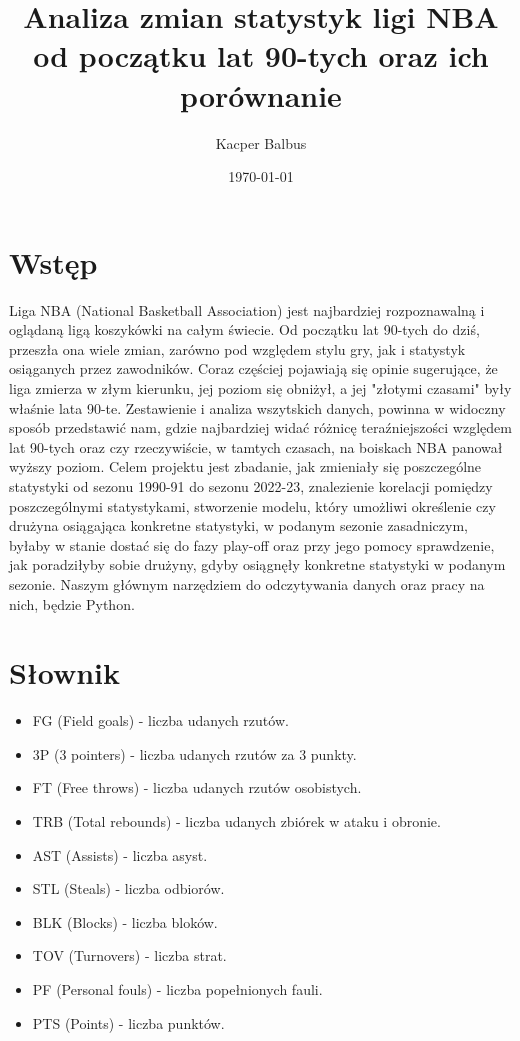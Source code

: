 \documentclass{article}
\title{Analiza zmian statystyk ligi NBA od początku lat 90-tych oraz ich porównanie}
\author{Kacper Balbus}
\date{\today}
\begin{document}
\maketitle

\newpage
\vspace{4cm}


\tableofcontents
\newpage

\section{Wstęp}



Liga NBA (National Basketball Association) jest najbardziej rozpoznawalną i oglądaną ligą koszykówki na całym świecie. Od początku lat 90-tych do dziś, przeszła ona wiele zmian, zarówno pod względem stylu gry, jak i statystyk osiąganych przez zawodników. Coraz częściej pojawiają się opinie sugerujące, że liga zmierza w złym kierunku, jej poziom się obniżył, a jej "złotymi czasami" były właśnie lata 90-te. Zestawienie i analiza wszytskich danych, powinna w widoczny sposób przedstawić nam, gdzie najbardziej widać różnicę teraźniejszości względem lat 90-tych oraz czy rzeczywiście, w tamtych czasach, na boiskach NBA panował wyższy poziom. Celem projektu jest zbadanie, jak zmieniały się poszczególne statystyki od sezonu 1990-91 do sezonu 2022-23, znalezienie korelacji pomiędzy poszczególnymi statystykami, stworzenie modelu, który umożliwi określenie czy drużyna osiągająca konkretne statystyki, w podanym sezonie zasadniczym, byłaby w stanie dostać się do fazy play-off oraz przy jego pomocy sprawdzenie, jak poradziłyby sobie drużyny, gdyby osiągnęły konkretne statystyki w podanym sezonie. Naszym głównym narzędziem do odczytywania danych oraz pracy na nich, będzie Python.


\section{Słownik}
\begin{itemize}
    \item FG (Field goals) - liczba udanych rzutów.
    \item 3P (3 pointers) - liczba udanych rzutów za 3 punkty.
    \item FT (Free throws) - liczba udanych rzutów osobistych.
    \item TRB (Total rebounds) - liczba udanych zbiórek w ataku i obronie.
    \item AST (Assists) - liczba asyst.
    \item STL (Steals) - liczba odbiorów.
    \item BLK (Blocks) - liczba bloków.
    \item TOV (Turnovers) - liczba strat.
    \item PF (Personal fouls) - liczba popełnionych fauli.
    \item PTS (Points) - liczba punktów.
\end{itemize}
\end{document}
